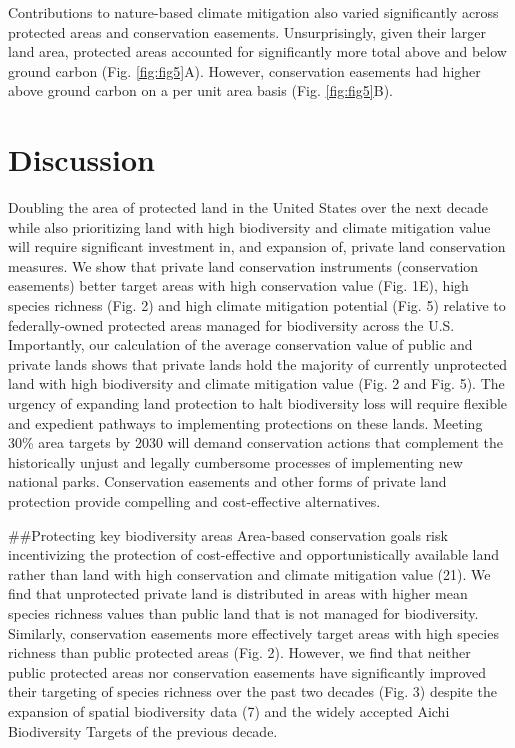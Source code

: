 \documentclass[3p]{elsarticle} %
\begin{document}
Contributions to nature-based climate mitigation also varied
significantly across protected areas and conservation easements.
Unsurprisingly, given their larger land area, protected areas accounted
for significantly more total above and below ground carbon (Fig.
\ref{fig:fig5}A). However, conservation easements had higher above
ground carbon on a per unit area basis (Fig. \ref{fig:fig5}B).

\hypertarget{discussion}{%
\section{Discussion}\label{discussion}}

Doubling the area of protected land in the United States over the next
decade while also prioritizing land with high biodiversity and climate
mitigation value will require significant investment in, and expansion
of, private land conservation measures. We show that private land
conservation instruments (conservation easements) better target areas
with high conservation value (Fig. 1E), high species richness (Fig. 2)
and high climate mitigation potential (Fig. 5) relative to
federally-owned protected areas managed for biodiversity across the U.S.
Importantly, our calculation of the average conservation value of public
and private lands shows that private lands hold the majority of
currently unprotected land with high biodiversity and climate mitigation
value (Fig. 2 and Fig. 5). The urgency of expanding land protection to
halt biodiversity loss will require flexible and expedient pathways to
implementing protections on these lands. Meeting 30\% area targets by
2030 will demand conservation actions that complement the historically
unjust and legally cumbersome processes of implementing new national
parks. Conservation easements and other forms of private land protection
provide compelling and cost-effective alternatives.

\#\#Protecting key biodiversity areas Area-based conservation goals risk
incentivizing the protection of cost-effective and opportunistically
available land rather than land with high conservation and climate
mitigation value (21). We find that unprotected private land is
distributed in areas with higher mean species richness values than
public land that is not managed for biodiversity. Similarly,
conservation easements more effectively target areas with high species
richness than public protected areas (Fig. 2). However, we find that
neither public protected areas nor conservation easements have
significantly improved their targeting of species richness over the past
two decades (Fig. 3) despite the expansion of spatial biodiversity data
(7) and the widely accepted Aichi Biodiversity Targets of the previous
decade.
\end{document}

